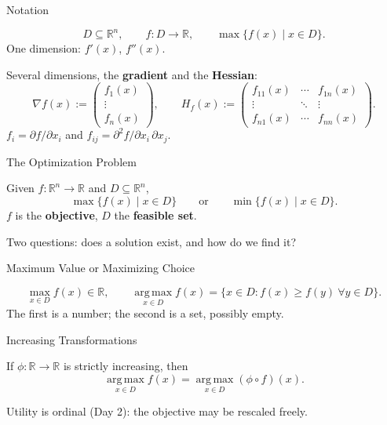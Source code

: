 \documentclass[11pt,aspectratio=169,c]{beamer}
\begin{document}
\begin{frame}{Notation}
\begin{definitionbox}
\[
D\subseteq\mathbb{R}^n,
\qquad
f:D\to\mathbb{R},
\qquad
\max\{f(x)\mid x\in D\}.
\]
One dimension: $f'(x)$, $f''(x)$.

\vspace{.6em}
Several dimensions, the \textbf{gradient} and the \textbf{Hessian}:
\[
\nabla f(x):=\begin{pmatrix} f_1(x)\\ \vdots\\ f_n(x) \end{pmatrix},
\qquad
H_f(x):=\begin{pmatrix}
f_{11}(x) & \cdots & f_{1n}(x)\\
\vdots & \ddots & \vdots\\
f_{n1}(x) & \cdots & f_{nn}(x)
\end{pmatrix}.
\]
\vspace{-.4em}
$f_i=\partial f/\partial x_i$ and $f_{ij}=\partial^2 f/\partial x_i\,\partial x_j$.
\end{definitionbox}
\end{frame}

\begin{frame}{The Optimization Problem}
\begin{definitionbox}[Sundaram 2.1]
Given $f:\mathbb{R}^n\to\mathbb{R}$ and $D\subseteq\mathbb{R}^n$,
\[
\max\{f(x)\mid x\in D\}
\qquad\text{or}\qquad
\min\{f(x)\mid x\in D\}.
\]
$f$ is the \textbf{objective}, $D$ the \textbf{feasible set}.
\end{definitionbox}

\vspace{.5em}
\centering Two questions: does a solution exist, and how do we find it?
\end{frame}

\begin{frame}{Maximum Value or Maximizing Choice}
\begin{definitionbox}
\[
\max_{x\in D} f(x)\in\mathbb{R},
\qquad
\operatorname*{arg\,max}_{x\in D} f(x)=\{x\in D: f(x)\geq f(y)\ \forall y\in D\}.
\]
The first is a number; the second is a set, possibly empty.
\end{definitionbox}
\end{frame}

\begin{frame}{Increasing Transformations}
\begin{propositionbox}
If $\phi:\mathbb{R}\to\mathbb{R}$ is strictly increasing, then
\[
\operatorname*{arg\,max}_{x\in D} f(x)
=\operatorname*{arg\,max}_{x\in D} (\phi\circ f)(x).
\]
\end{propositionbox}

\vspace{.5em}
\centering Utility is ordinal (Day 2): the objective may be rescaled freely.
\end{frame}
\end{document}
